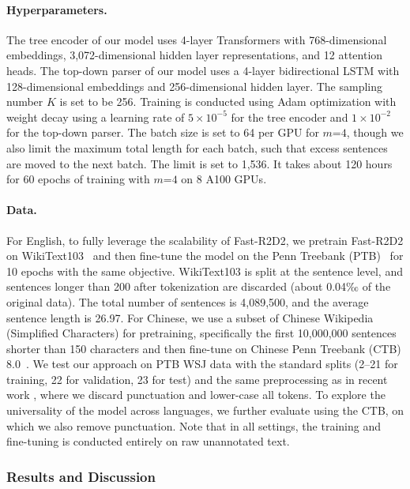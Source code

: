 \paragraph{Hyperparameters.} The tree encoder of our model uses 4-layer Transformers with 768-dimensional embeddings, 
3,072-dimensional hidden layer representations, and 12 attention heads. 
The top-down parser of our model uses a 4-layer bidirectional LSTM with 128-dimensional embeddings and 256-dimensional hidden layer. The sampling number $K$ is set to be 256.
Training is conducted using Adam optimization with weight decay using a learning rate of $5 \times 10^{-5}$ for the tree encoder and $1 \times 10^{-2}$ for the top-down parser.
The batch size is set to 64 per GPU for $m$=$4$, though we also limit the maximum total length for each batch, such that excess sentences are moved to the next batch. The limit is set to 1,536. It takes about 120 hours for 60 epochs of training with $m$=$4$ on 8 A100 GPUs.

\paragraph{Data.}  For English, to fully leverage the scalability of Fast-R2D2, we pretrain Fast-R2D2 on WikiText103~\cite{DBLP:conf/iclr/MerityX0S17}
and then fine-tune the model on the Penn Treebank (PTB)~\cite{marcus-etal-1993-building}
for 10 epochs with the same objective.
WikiText103 is split at the sentence level, and sentences longer than 200 after tokenization are discarded (about 0.04‰ of the original data). 
The total number of sentences is 4,089,500, and the average sentence length is 26.97.
For Chinese, we use a subset of Chinese Wikipedia (Simplified Characters) for pretraining, specifically the first 10,000,000 sentences shorter than 150 characters and then fine-tune on Chinese Penn Treebank (CTB) 8.0~\cite{ctb8}.
We test our approach on PTB WSJ data with the standard splits (2--21 for training, 22 for validation, 23 for test) and the same preprocessing as in recent work \cite{kim-etal-2019-compound}, where we discard punctuation and lower-case all tokens. 
To explore the universality of the model across languages, we further evaluate using the CTB,
on which we also remove punctuation.
Note that in all settings, the training and fine-tuning is conducted entirely on raw unannotated text.

\subsubsection{Results and Discussion}

